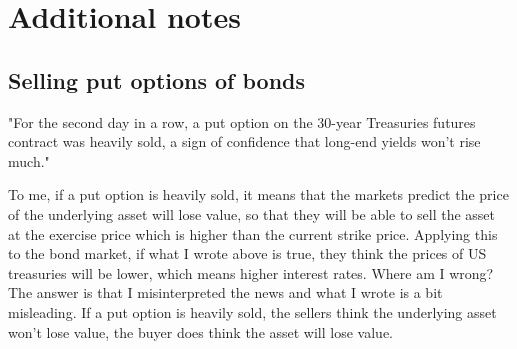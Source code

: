 \section{Additional notes}

\subsection{Selling put options of bonds}
"For the second day in a row, a put option on the 30-year Treasuries futures contract was heavily sold, a sign of confidence that long-end yields won’t rise much." \citep{yield_inversion}

To me, if a put option is heavily sold, it means that the markets predict the price of the underlying asset will lose value, so that they will be able to sell the asset at the exercise price which is higher than the current strike price. Applying this to the bond market, if what I wrote above is true, they think the prices of US treasuries will be lower, which means higher interest rates. Where am I wrong? The answer is that I misinterpreted the news and what I wrote is a bit misleading. If a put option is heavily sold, the sellers think the underlying asset won't lose value, the buyer does think the asset will lose value.

